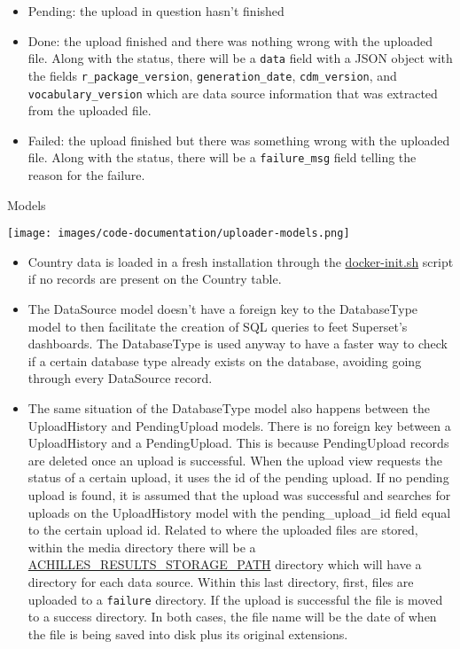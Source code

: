 \documentclass[
]{book}
\providecommand{\tightlist}{%
  \setlength{\itemsep}{0pt}\setlength{\parskip}{0pt}}
\begin{document}
\begin{itemize}
\tightlist
\item
  Pending: the upload in question hasn't finished
\item
  Done: the upload finished and there was nothing wrong with the uploaded file.
  Along with the status, there will be a \texttt{data} field with a JSON object with the fields \texttt{r\_package\_version}, \texttt{generation\_date}, \texttt{cdm\_version}, and \texttt{vocabulary\_version} which are data source information that was extracted from the uploaded file.
\item
  Failed: the upload finished but there was something wrong with the uploaded file.
  Along with the status, there will be a \texttt{failure\_msg} field telling the reason for the failure.
\end{itemize}

Models

\texttt{[image: images/code-documentation/uploader-models.png]}

\begin{itemize}
\tightlist
\item
  Country data is loaded in a fresh installation through the \href{https://github.com/EHDEN/NetworkDashboards/blob/master/dashboard_viewer/docker-init.sh}{docker-init.sh} script if no records are present on the Country table.
\item
  The DataSource model doesn't have a foreign key to the DatabaseType model to then facilitate the creation of SQL queries to feet Superset's dashboards.
  The DatabaseType is used anyway to have a faster way to check if a certain database type already exists on the database, avoiding going through every DataSource record.
\item
  The same situation of the DatabaseType model also happens between the UploadHistory and PendingUpload models.
  There is no foreign key between a UploadHistory and a PendingUpload.
  This is because PendingUpload records are deleted once an upload is successful.
  When the upload view requests the status of a certain upload, it uses the id of the pending upload.
  If no pending upload is found, it is assumed that the upload was successful and searches for uploads on the UploadHistory model with the pending\_upload\_id field equal to the certain upload id.
  Related to where the uploaded files are stored, within the media directory there will be a \href{https://github.com/EHDEN/NetworkDashboards/blob/master/dashboard_viewer/dashboard_viewer/settings.py\#L198}{ACHILLES\_RESULTS\_STORAGE\_PATH} directory which will have a directory for each data source.
  Within this last directory, first, files are uploaded to a \texttt{failure} directory.
  If the upload is successful the file is moved to a success directory.
  In both cases, the file name will be the date of when the file is being saved into disk plus its original extensions.
\end{itemize}
\end{document}
